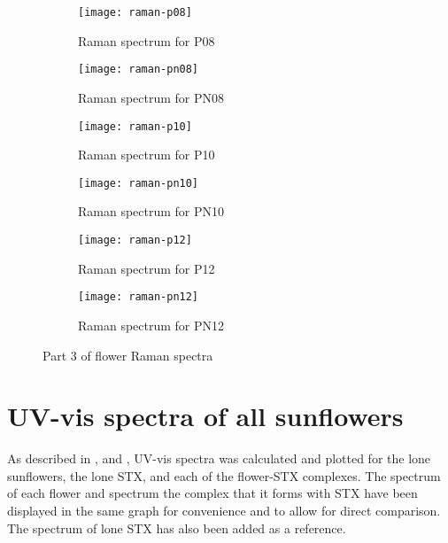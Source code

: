 \newpage

\begin{figure*}[h]
\centering
\begin{subfigure}{8.25cm}\centering\texttt{[image: raman-p08]}\caption{Raman spectrum for P08}\end{subfigure}%
\begin{subfigure}{8.25cm}\centering\texttt{[image: raman-pn08]}\caption{Raman spectrum for PN08}\end{subfigure}
\begin{subfigure}{8.25cm}\centering\texttt{[image: raman-p10]}\caption{Raman spectrum for P10}\end{subfigure}%
\begin{subfigure}{8.25cm}\centering\texttt{[image: raman-pn10]}\caption{Raman spectrum for PN10}\end{subfigure}
\begin{subfigure}{8.25cm}\centering\texttt{[image: raman-p12]}\caption{Raman spectrum for P12}\end{subfigure}%
\begin{subfigure}{8.25cm}\centering\texttt{[image: raman-pn12]}\caption{Raman spectrum for PN12}\end{subfigure}
\caption[Part 3 of flower Raman spectra]{Part 3 of flower Raman spectra}
\end{figure*}

\newpage
\section{UV-vis spectra of all sunflowers}

As described in ,  and , UV-vis spectra was calculated and plotted for the lone sunflowers, the lone STX, and each of the flower-STX complexes.
The spectrum of each flower and spectrum the complex that it forms with STX have been displayed in the same graph for convenience and to allow for direct comparison.
The spectrum of lone STX has also been added as a reference.


